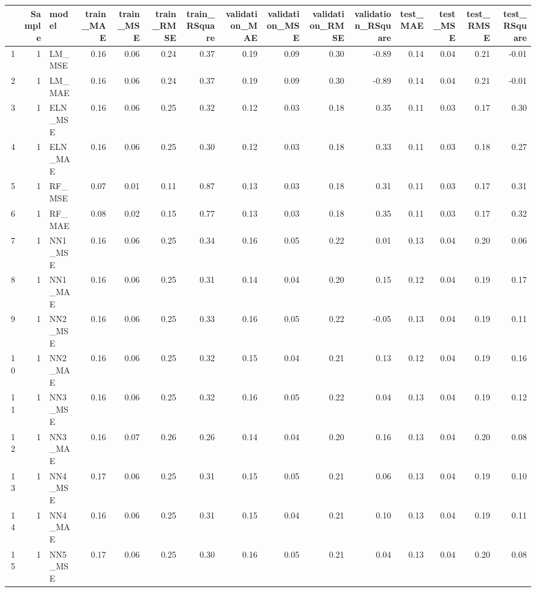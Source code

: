\begin{table}[ht]
\centering
\begin{tabular}{rrlrrrrrrrrrrrr}
  \hline
 & Sample & model & train\_MAE & train\_MSE & train\_RMSE & train\_RSquare & validation\_MAE & validation\_MSE & validation\_RMSE & validation\_RSquare & test\_MAE & test\_MSE & test\_RMSE & test\_RSquare \\ 
  \hline
1 &   1 & LM\_MSE & 0.16 & 0.06 & 0.24 & 0.37 & 0.19 & 0.09 & 0.30 & -0.89 & 0.14 & 0.04 & 0.21 & -0.01 \\ 
  2 &   1 & LM\_MAE & 0.16 & 0.06 & 0.24 & 0.37 & 0.19 & 0.09 & 0.30 & -0.89 & 0.14 & 0.04 & 0.21 & -0.01 \\ 
  3 &   1 & ELN\_MSE & 0.16 & 0.06 & 0.25 & 0.32 & 0.12 & 0.03 & 0.18 & 0.35 & 0.11 & 0.03 & 0.17 & 0.30 \\ 
  4 &   1 & ELN\_MAE & 0.16 & 0.06 & 0.25 & 0.30 & 0.12 & 0.03 & 0.18 & 0.33 & 0.11 & 0.03 & 0.18 & 0.27 \\ 
  5 &   1 & RF\_MSE & 0.07 & 0.01 & 0.11 & 0.87 & 0.13 & 0.03 & 0.18 & 0.31 & 0.11 & 0.03 & 0.17 & 0.31 \\ 
  6 &   1 & RF\_MAE & 0.08 & 0.02 & 0.15 & 0.77 & 0.13 & 0.03 & 0.18 & 0.35 & 0.11 & 0.03 & 0.17 & 0.32 \\ 
  7 &   1 & NN1\_MSE & 0.16 & 0.06 & 0.25 & 0.34 & 0.16 & 0.05 & 0.22 & 0.01 & 0.13 & 0.04 & 0.20 & 0.06 \\ 
  8 &   1 & NN1\_MAE & 0.16 & 0.06 & 0.25 & 0.31 & 0.14 & 0.04 & 0.20 & 0.15 & 0.12 & 0.04 & 0.19 & 0.17 \\ 
  9 &   1 & NN2\_MSE & 0.16 & 0.06 & 0.25 & 0.33 & 0.16 & 0.05 & 0.22 & -0.05 & 0.13 & 0.04 & 0.19 & 0.11 \\ 
  10 &   1 & NN2\_MAE & 0.16 & 0.06 & 0.25 & 0.32 & 0.15 & 0.04 & 0.21 & 0.13 & 0.12 & 0.04 & 0.19 & 0.16 \\ 
  11 &   1 & NN3\_MSE & 0.16 & 0.06 & 0.25 & 0.32 & 0.16 & 0.05 & 0.22 & 0.04 & 0.13 & 0.04 & 0.19 & 0.12 \\ 
  12 &   1 & NN3\_MAE & 0.16 & 0.07 & 0.26 & 0.26 & 0.14 & 0.04 & 0.20 & 0.16 & 0.13 & 0.04 & 0.20 & 0.08 \\ 
  13 &   1 & NN4\_MSE & 0.17 & 0.06 & 0.25 & 0.31 & 0.15 & 0.05 & 0.21 & 0.06 & 0.13 & 0.04 & 0.19 & 0.10 \\ 
  14 &   1 & NN4\_MAE & 0.16 & 0.06 & 0.25 & 0.31 & 0.15 & 0.04 & 0.21 & 0.10 & 0.13 & 0.04 & 0.19 & 0.11 \\ 
  15 &   1 & NN5\_MSE & 0.17 & 0.06 & 0.25 & 0.30 & 0.16 & 0.05 & 0.21 & 0.04 & 0.13 & 0.04 & 0.20 & 0.08 \\ 

\end{tabular}
\end{table}

